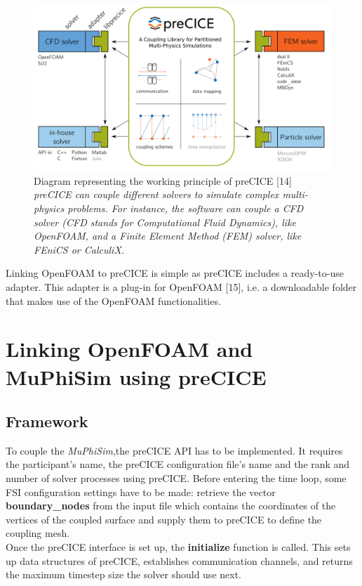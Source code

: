 \documentclass[oneside,11pt,times]{book}
\begin{document}
\begin{figure}[h]
    \centering
    \includegraphics[width=12.5cm]{imgs/Illustrations/precice-overview.png}
    \caption{Diagram representing the working principle of preCICE [14]\\ \emph{preCICE can couple different solvers to simulate complex multi-physics problems. For instance, the software can couple a CFD solver (CFD stands for Computational Fluid Dynamics), like OpenFOAM, and a Finite Element Method (FEM) solver, like FEniCS or CalculiX.}}
    \label{}
\end{figure}

Linking OpenFOAM to preCICE is simple as preCICE includes a ready-to-use adapter. This adapter is a plug-in for OpenFOAM [15], i.e. a downloadable folder that makes use of the OpenFOAM functionalities.

\section{Linking OpenFOAM and MuPhiSim using preCICE}


\subsection{Framework}

To couple the \textit{MuPhiSim},the preCICE API has to be implemented. It requires the participant’s name, the preCICE configuration file’s name and the rank and number of solver processes using preCICE. Before entering the time loop, some FSI configuration settings have to be made: retrieve the vector \textbf{boundary\_nodes} from the input file which contains the coordinates of the vertices of the coupled surface and supply them to preCICE to define the coupling mesh.\\

Once the preCICE interface is set up, the \textbf{initialize} function is called. This  sets up data structures of preCICE, establishes communication channels, and returns the maximum timestep size the solver should use next.\\
\end{document}
